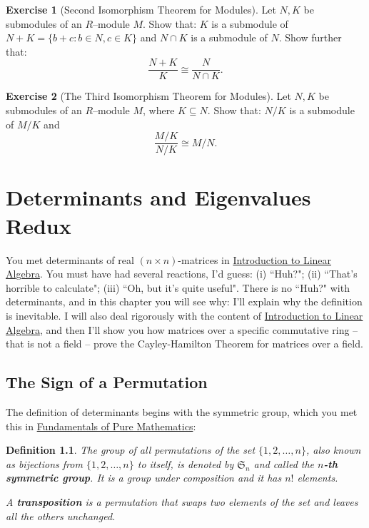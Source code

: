 \documentclass[11pt]{amsbook}
\newtheorem{definition}[theorem]{Definition}
\theoremstyle{definition}
\newtheorem{exercise}{Exercise}
\begin{document}
\begin{exercise}[Second Isomorphism Theorem for Modules] Let $N,K$ be submodules of an $R$--module $M$. Show that:
$K$ is a submodule of $N+K = \{ b+c : b\in N, c\in K\}$ and $N\cap
K$ is a submodule of $N$. Show further that: $$\frac{N+K}{K} \cong
\frac{N}{N\cap K}.$$
\end{exercise}

\begin{exercise}[The Third Isomorphism Theorem for Modules] Let $N,K$ be submodules of an $R$--module $M$, where
$K\subseteq N$. Show that: $N/K$ is a submodule of $M/K$ and
$$\frac{M/K}{N/K} \cong M/N.$$
\end{exercise}

\chapter{Determinants and Eigenvalues Redux}

You met determinants of real $(n\times n)$-matrices in \href{www.drps.ed.ac.uk/12-13/dpt/cxmath08057.htm}{Introduction to Linear Algebra}. You must have had several reactions, I'd guess: (i) ``Huh?"; (ii) ``That's horrible to calculate"; (iii) ``Oh, but it's quite useful". There is no ``Huh?" with determinants, and in this chapter you will see why: I'll explain why the definition is inevitable. I will also deal rigorously with the content of \href{www.drps.ed.ac.uk/12-13/dpt/cxmath08057.htm}{Introduction to Linear Algebra}, and then I'll show you how matrices over a specific commutative ring -- that is not a field -- prove the Cayley-Hamilton Theorem for matrices over a field.

\section{The Sign of a Permutation}
The definition of determinants begins with the {symmetric group}, which you met this in \href{http://www.drps.ed.ac.uk/12-13/dpt/cxmath08064.htm}{Fundamentals of Pure Mathematics}:

\begin{definition} The group of all permutations of the set $\{ 1, 2, \ldots , n \}$, also known as bijections from $\{1,2, \ldots ,n \}$ to itself, is denoted by $\mathfrak{S}_n$ and called the {\bf $n$-th symmetric group}. It is a group under composition and it has $n!$ elements.

A {\bf transposition} is a permutation that swaps two elements of the set and leaves all the others unchanged.
 \end{definition}
\end{document}

